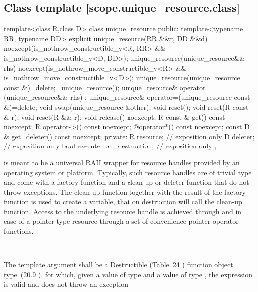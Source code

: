 \documentclass[ebook,11pt,article]{memoir}
\begin{document}
\subsection {Class template  [scope.unique_resource.class]}

\begin{codeblock}
template<class R,class D>
class unique_resource {
public:
  template<typename RR, typename DD>
  explicit unique_resource(RR &&r, DD &&d)
    noexcept(is_nothrow_constructible_v<R, RR> &&
             is_nothrow_constructible_v<D, DD>);
  unique_resource(unique_resource&& rhs)
  	noexcept(is_nothrow_move_constructible_v<R> &&
             is_nothrow_move_constructible_v<D>);
  unique_resource(unique_resource const &)=delete; 
  ~unique_resource();
  unique_resource& operator=(unique_resource&& rhs) ;
  unique_resource& operator=(unique_resource const &)=delete;
  void swap(unique_resource &other);
  void reset();
  void reset(R const & r);
  void reset(R && r);
  void release() noexcept;
  R const & get() const noexcept;
  R operator->() const noexcept;
  @\seebelow@ operator*() const noexcept;
  const D & get_deleter() const noexcept;
private:
  R resource; // exposition only
  D deleter; // exposition only
  bool execute_on_destruction; // exposition only
};
\end{codeblock}

\pnum
\enternote
{} is meant to be a universal RAII wrapper for resource handles provided by an operating system or platform.
Typically, such resource handles are of trivial type and come with a factory function and a clean-up or deleter function that do not throw exceptions.
The clean-up function together with the result of the factory function is used to create a  variable, that on destruction will call the clean-up function. Access to the underlying resource handle is achieved through  and in case of a pointer type resource through a set of convenience pointer operator functions.
\exitnote

\pnum
\requires
{}\\


\pnum 
The template argument
 shall be a 
Destructible 
(Table~24
) function object type~(20.9
), 
for which, given
a value  of type  and a value
 of type , the expression
 is valid and does not throw an exception.
\end{document}
